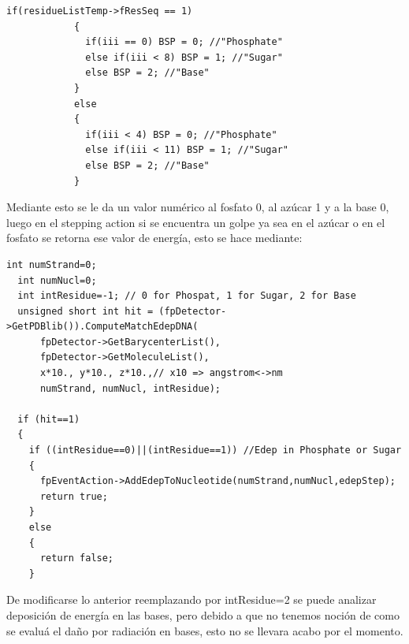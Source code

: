 \lstset {language=C++}
\begin{lstlisting}
if(residueListTemp->fResSeq == 1)
            {
              if(iii == 0) BSP = 0; //"Phosphate"
              else if(iii < 8) BSP = 1; //"Sugar"
              else BSP = 2; //"Base"
            }
            else
            {
              if(iii < 4) BSP = 0; //"Phosphate"
              else if(iii < 11) BSP = 1; //"Sugar"
              else BSP = 2; //"Base"
            }
\end{lstlisting}
Mediante esto se le da un valor numérico al fosfato 0, al azúcar 1 y a la base 0, luego en el stepping action si se encuentra un golpe ya sea en el azúcar o en el fosfato se retorna ese valor de energía, esto se hace mediante:
\lstset {language=C++}
\begin{lstlisting}
int numStrand=0;
  int numNucl=0;
  int intResidue=-1; // 0 for Phospat, 1 for Sugar, 2 for Base
  unsigned short int hit = (fpDetector->GetPDBlib()).ComputeMatchEdepDNA(
      fpDetector->GetBarycenterList(),
      fpDetector->GetMoleculeList(),
      x*10., y*10., z*10.,// x10 => angstrom<->nm
      numStrand, numNucl, intResidue);

  if (hit==1)
  {
    if ((intResidue==0)||(intResidue==1)) //Edep in Phosphate or Sugar
    {
      fpEventAction->AddEdepToNucleotide(numStrand,numNucl,edepStep);
      return true;
    }
    else
    {
      return false;
    }
    \end{lstlisting}

    De modificarse lo anterior reemplazando por intResidue=2 se puede analizar deposición de energía en las bases, pero debido a que no tenemos noción de como se evaluá el daño por radiación en bases, esto no se llevara acabo por el momento.\\



